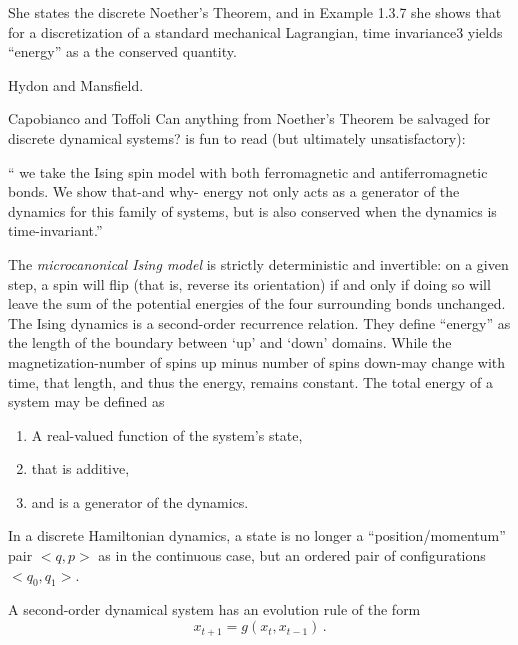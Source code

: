 \begin{description}
{She states the discrete {Noether's} Theorem, and in Example 1.3.7  she shows
that for a discretization of a standard mechanical Lagrangian, time
invariance3 yields ``energy'' as a the conserved quantity.

Hydon and Mansfield.

Capobianco and Toffoli {Can anything from {Noether's} Theorem be
salvaged for discrete dynamical systems?} is fun to read (but ultimately
unsatisfactory):

``
we take the Ising spin model with both
ferromagnetic and antiferromagnetic bonds. We show that-and why-
energy not only acts as a generator of the dynamics for this family of
systems, but is also conserved when the dynamics is time-invariant.''

The \emph{microcanonical Ising model} is strictly deterministic and
invertible: on a given step, a spin will flip (that is, reverse its
orientation) if and only if doing so will leave the sum of the potential
energies of the four surrounding bonds unchanged. The Ising dynamics is a
second-order recurrence relation. They define ``energy'' as the length of the
boundary between `up' and `down' domains. While the magnetization-number of
spins up minus number of spins down-may change with time, that length, and
thus the energy, remains constant. The total energy of a system may be
defined as
\begin{enumerate}
  \item A real-valued function of the system's state,
  \item that is additive,
  \item and is a generator of the dynamics.
\end{enumerate}
In a discrete Hamiltonian dynamics, a state is no longer a
``position/momentum'' pair $<q,p>$ as in the continuous case, but an ordered
pair of configurations $<q_0,q_1>$.

A second-order dynamical system
has an evolution rule of the form
\[
x_{t+1} = g(x_{t},x_{t-1})
\,.
\]
            }



\end{description}
